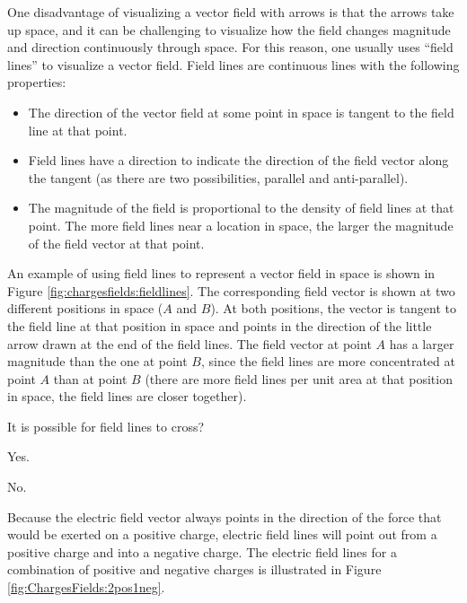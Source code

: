 One disadvantage of visualizing a vector field with arrows is that the arrows take up space, and it can be challenging to visualize how the field changes magnitude and direction continuously through space. For this reason, one usually uses ``field lines'' to visualize a vector field. Field lines are continuous lines with the following properties:
\begin{itemize}
\item The direction of the vector field at some point in space is tangent to the field line at that point.
\item Field lines have a direction to indicate the direction of the field vector along the tangent (as there are two possibilities, parallel and anti-parallel).
\item The magnitude of the field is proportional to the density of field lines at that point. The more field lines near a location in space, the larger the magnitude of the field vector at that point.
\end{itemize}
An example of using field lines to represent a vector field in space is shown in Figure \ref{fig:chargesfields:fieldlines}. The corresponding field vector is shown at two different positions in space ($A$ and $B$). At both positions, the vector is tangent to the field line at that position in space and points in the direction of the little arrow drawn at the end of the field lines. The field vector at point $A$ has a larger magnitude than the one at point $B$, since the field lines are more concentrated at point $A$ than at point $B$ (there are more field lines per unit area at that position in space, the field lines are closer together).
\begin{checkpoint}\label{cp:chargesfields:efield}
\begin{MCquestion}{It is possible for field lines to cross?}
\item Yes.
\item No. \correct
\end{MCquestion}
\end{checkpoint}
Because the electric field vector always points in the direction of the force that would be exerted on a positive charge, electric field lines will point out from a positive charge and into a negative charge. The electric field lines for a combination of positive and negative charges is illustrated in Figure \ref{fig:ChargesFields:2pos1neg}.

